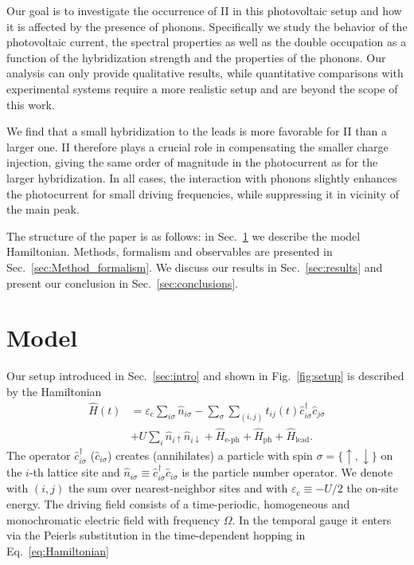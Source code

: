 \documentclass[aps,prb,groupedaddress,showpacs,twocolumn,superscriptaddress,10pt]{revtex4-2}
\begin{document}
Our goal is to investigate the occurrence of II in this photovoltaic setup and how it is affected by the presence of phonons. 
Specifically we study the behavior of the photovoltaic current, the spectral properties as well as the double occupation as a function of the hybridization strength and the properties of the phonons. Our analysis can only provide qualitative results, while quantitative comparisons with experimental systems require a more realistic setup and are beyond the scope of this work.

We find that a small hybridization to the leads is more favorable for II than a larger one. II therefore plays a crucial role in compensating the smaller charge injection, giving the same order of magnitude in the photocurrent as for the larger hybridization.
In all cases, the interaction with phonons slightly enhances the photocurrent for small driving frequencies, while suppressing it in vicinity of the main peak.

The structure of the paper is as follows: in Sec.~\ref{sec:Model} we describe the model Hamiltonian. Methods, formalism and observables are presented in Sec.~\ref{sec:Method_formalism}. We discuss our results in Sec.~\ref{sec:results} and present our conclusion in Sec.~\ref{sec:conclusions}. 
 
  
\section{Model}
\label{sec:Model}

Our setup introduced in Sec.~\ref{sec:intro} and shown in Fig.~\ref{fig:setup} is described by the Hamiltonian
%
\begin{equation}
\label{eq:Hamiltonian}
\begin{split} 
\hat{H}(t)&=\varepsilon_{\text{c}} \sum_{i\sigma}\hat{n}_{i\sigma} -\sum_{\sigma}\sum_{(i,j)} t_{ij}(t) \hat{c}^{\dagger}_{i\sigma} \hat{c}_{j\sigma}
\\ & + U \sum_{i} \hat{n}_{i\uparrow} \hat{n}_{i\downarrow}+\hat{H}_{\text{e-ph}} + \hat{H}_{\text{ph}}+\hat{H}_{\text{lead}}.
\end{split}
\end{equation}
% 
The operator $\hat{c}^{\dagger}_{i\sigma}$ ($\hat{c}_{i\sigma}$) creates (annihilates) a particle with spin $\sigma= \lbrace \uparrow,\downarrow \rbrace$ on the $i$-th lattice site and $\hat{n}_{i\sigma}\equiv \hat{c}^{\dagger}_{i\sigma} \hat{c}_{i\sigma}$ is the particle number operator. We denote with $(i,j)$ the sum over nearest-neighbor sites and with $\varepsilon_{\text{c}} \equiv -U/2$ the on-site energy. The driving field consists of a time-periodic, homogeneous and monochromatic electric field with frequency $\Omega$. In the temporal gauge it enters via the Peierls substitution in the time-dependent hopping in Eq.~\eqref{eq:Hamiltonian}~\cite{peie.33}
\end{document}
